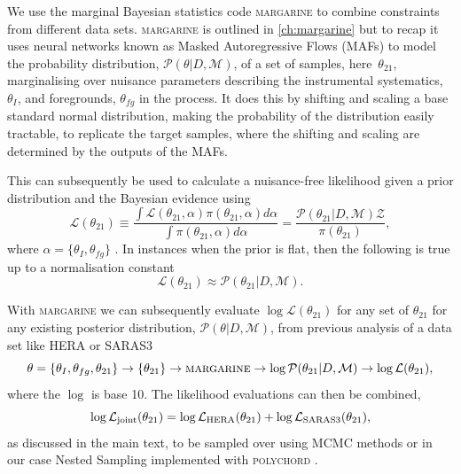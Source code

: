 We use the marginal Bayesian statistics code \textsc{margarine} \cite{margarine_neurips} to combine constraints from different data sets. \textsc{margarine} is outlined in \cref{ch:margarine} but to recap it uses neural networks known as Masked Autoregressive Flows (MAFs) to model the probability distribution, $\mathcal{P}(\theta|D, \mathcal{M})$, of a set of samples, here~{$\theta_{21}$}, marginalising over nuisance parameters describing the instrumental systematics, $\theta_{I}$, and foregrounds, $\theta_{fg}$ in the process. It does this by shifting and scaling a base standard normal distribution, making the probability of the distribution easily tractable, to replicate the target samples, where the shifting and scaling are determined by the outputs of the MAFs. 

This can subsequently be used to calculate a nuisance-free likelihood given a prior distribution and the Bayesian evidence using
\begin{equation}
    \mathcal{L}(\theta_{21}) 
\equiv \frac{\int\mathcal{L}(\theta_{21},\alpha)\pi(\theta_{21},\alpha)d\alpha}{\int \pi(\theta_{21},\alpha)d\alpha} = \frac{\mathcal{P}(\theta_{21}|D, \mathcal{M})\mathcal{Z}}{\pi(\theta_{21})},
    \label{eq:partial_joint}
\end{equation}
where $\alpha = \{\theta_{I}, \theta_{fg}\}$ \cite{margarine_maxent}. In instances when the prior is flat, then the following is true up to a normalisation constant
\begin{equation}
    \mathcal{L}(\theta_{21}) \approx \mathcal{P}(\theta_{21}|D, \mathcal{M}).
\end{equation}

With \textsc{margarine} we can subsequently evaluate $\log \mathcal{L}(\theta_{21})$ for any set of $\theta_{21}$ for any existing posterior distribution, $\mathcal{P}(\theta|D, \mathcal{M})$, from previous analysis of a data set like HERA or SARAS3
\begin{equation}
    \theta = \{\theta_{I}, \theta_{fg}, \theta_{21}\} \rightarrow \{\theta_{21}\} \rightarrow \textsc{margarine} \rightarrow \log \mathcal{P}(\theta_{21}|D, \mathcal{M}) \rightarrow \log \mathcal{L}(\theta_{21}),
\end{equation}
where the $\log$ is base 10. The likelihood evaluations can then be combined,
\begin{equation}
    \log \mathcal{L}_{\textnormal{joint}}(\theta_{21}) = \log \mathcal{L}_{\textnormal{HERA}}(\theta_{21}) + \log \mathcal{L}_{\textnormal{SARAS3}}(\theta_{21}),
\end{equation}
as discussed in the main text, to be sampled over using MCMC methods or in our case Nested Sampling implemented with \textsc{polychord} \cite{Handley2015a, Handley2015b}. 

